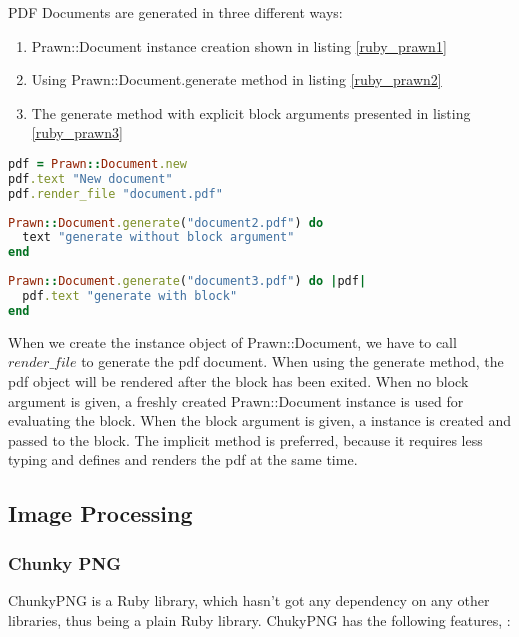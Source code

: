 PDF Documents are generated in three different ways:
\begin{enumerate}
  \item Prawn::Document instance creation shown in listing \ref{ruby_prawn1}
  \item Using Prawn::Document.generate method in listing \ref{ruby_prawn2}
  \item The generate method with explicit block arguments presented in listing \ref{ruby_prawn3}
\end{enumerate}

\begin{lstlisting}[language=Ruby, caption={Prawn Document generation with instance creation}, label=ruby_prawn1]
pdf = Prawn::Document.new
pdf.text "New document"
pdf.render_file "document.pdf"
\end{lstlisting}

\begin{lstlisting}[language=Ruby, caption={Prawn Document generation with method}, label=ruby_prawn2]
Prawn::Document.generate("document2.pdf") do 
  text "generate without block argument"
end
\end{lstlisting}

\begin{lstlisting}[language=Ruby, caption={Prawn Document generation with block argument}, label=ruby_prawn3]
Prawn::Document.generate("document3.pdf") do |pdf|
  pdf.text "generate with block"
end
\end{lstlisting}

When we create the instance object of Prawn::Document, we have to call $render\_file$ to generate the pdf document. 
When using the generate method, the pdf object will be rendered after the block has been exited. When no block argument is given, a freshly created Prawn::Document instance is used for evaluating the block. When the block argument is given, a instance is created and passed to the block. The implicit method is preferred, because it requires less typing and defines and renders the pdf at the same time. 


\subsection{Image Processing}

\subsubsection{Chunky PNG}

ChunkyPNG is a Ruby library, which hasn't got any dependency on any other libraries, thus being a plain Ruby library.
ChukyPNG has the following features, \cite{chunky_png}:


